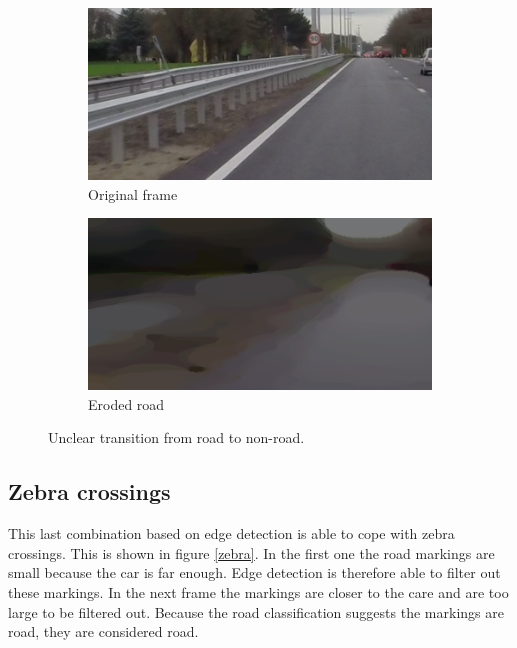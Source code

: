 \documentclass[runningheads,a4paper]{llncs}
\begin{document}
\begin{figure}[ht]
\centering
\begin{subfigure}{.5\textwidth}
  \centering
  \includegraphics[width=.9\textwidth]{fig/transition_road_dirt_original.png}
  \caption{Original frame\label{transition_road_dirt_original}}
\end{subfigure}%
\begin{subfigure}{.5\textwidth}
  \centering
  \includegraphics[width=.9\textwidth]{fig/transition_road_dirt_eroded.png}
  \caption{Eroded road\label{transition_road_dirt_eroded}}
\end{subfigure}
\caption{Unclear transition from road to non-road.}
\end{figure}

\subsection{Zebra crossings}

This last combination based on edge detection is able to cope with zebra crossings. This is shown in figure \ref{zebra}. In the first one the road markings are small because the car is far enough. Edge detection is therefore able to filter out these markings. In the next frame the markings are closer to the care and are too large to be filtered out. Because the road classification suggests the markings are road, they are considered road.
\end{document}
